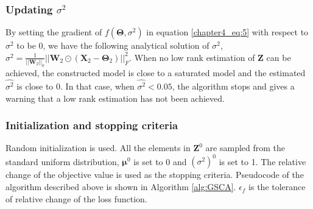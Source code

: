 \subsubsection*{Updating $\sigma^2$}
By setting the gradient of $f(\mathbf{\Theta},\sigma^2)$ in equation \ref{chapter4_eq:5} with respect to $\sigma^2$ to be 0, we have the following analytical solution of $\sigma^2$,  $\sigma^2= \frac{1}{||\mathbf{W}_2||_0} ||\mathbf{W}_2 \odot (\mathbf{X}_2 - \mathbf{\Theta}_2)||_F^2$. When no low rank estimation of $\mathbf{Z}$ can be achieved, the constructed model is close to a saturated model and the estimated $\hat{\sigma^2}$ is close to 0. In that case, when $\hat{\sigma^2}<0.05$, the algorithm stops and gives a warning that a low rank estimation has not been achieved.

\subsubsection*{Initialization and stopping criteria}
Random initialization is used. All the elements in $\mathbf{Z}^0$ are sampled from the standard uniform distribution, $\bm{\mu}^0$ is set to 0 and $(\sigma^2)^0$ is set to 1. The relative change of the objective value is used as the stopping criteria. Pseudocode of the algorithm described above is shown in Algorithm \ref{alg:GSCA}. $\epsilon_f$ is the tolerance of relative change of the loss function.


